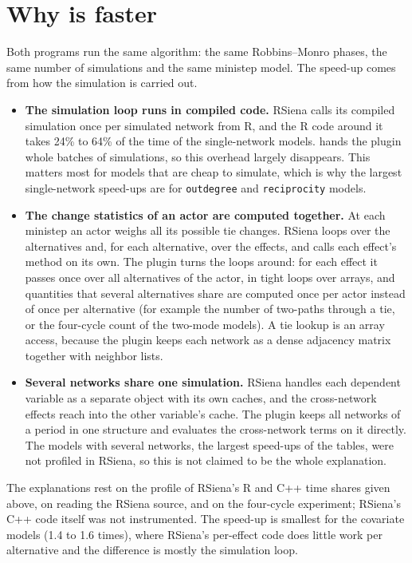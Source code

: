 \section{Why \nwsaom{} is faster}\label{sec:whyfast}
Both programs run the same algorithm: the same Robbins--Monro phases, the same number of simulations and the same ministep model. The speed-up comes from how the simulation is carried out.
\begin{itemize}
\item \textbf{The simulation loop runs in compiled code.} RSiena calls its compiled simulation once per simulated network from R, and the R code around it takes 24\% to 64\% of the time of the single-network models. \nwsaom{} hands the plugin whole batches of simulations, so this overhead largely disappears. This matters most for models that are cheap to simulate, which is why the largest single-network speed-ups are for \texttt{outdegree} and \texttt{reciprocity} models.
\item \textbf{The change statistics of an actor are computed together.} At each ministep an actor weighs all its possible tie changes. RSiena loops over the alternatives and, for each alternative, over the effects, and calls each effect's method on its own. The plugin turns the loops around: for each effect it passes once over all alternatives of the actor, in tight loops over arrays, and quantities that several alternatives share are computed once per actor instead of once per alternative (for example the number of two-paths through a tie, or the four-cycle count of the two-mode models). A tie lookup is an array access, because the plugin keeps each network as a dense adjacency matrix together with neighbor lists.
\item \textbf{Several networks share one simulation.} RSiena handles each dependent variable as a separate object with its own caches, and the cross-network effects reach into the other variable's cache. The plugin keeps all networks of a period in one structure and evaluates the cross-network terms on it directly. The models with several networks, the largest speed-ups of the tables, were not profiled in RSiena, so this is not claimed to be the whole explanation.
\end{itemize}
The explanations rest on the profile of RSiena's R and C++ time shares given above, on reading the RSiena source, and on the four-cycle experiment; RSiena's C++ code itself was not instrumented. The speed-up is smallest for the covariate models (1.4 to 1.6 times), where RSiena's per-effect code does little work per alternative and the difference is mostly the simulation loop.

